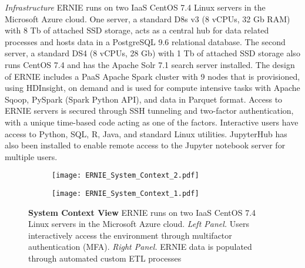 \documentclass[review]{elsarticle}
\begin{document}
\emph{Infrastructure} ERNIE runs on two IaaS CentOS 7.4 Linux servers in the Microsoft Azure cloud. One server, a standard D8s v3 (8 vCPUs, 32 Gb RAM) with 8 Tb of attached SSD storage, acts as a central hub for data related processes and hosts data in a PostgreSQL 9.6 relational database. The second server, a standard DS4 (8 vCPUs, 28 Gb) with 1 Tb of attached SSD storage also runs CentOS 7.4 and has the Apache Solr 7.1 search server installed. The design of ERNIE includes a PaaS Apache Spark cluster with 9 nodes  that is provisioned, using HDInsight, on demand and  is used for compute intensive tasks with Apache Sqoop, PySpark (Spark Python API), and data in Parquet format. Access to ERNIE servers is secured through SSH tunneling and two-factor authentication, with a unique time-based code acting as one of the factors. Interactive users have access to Python, SQL, R, Java, and standard Linux utilities. JupyterHub has also been installed to enable remote access to the Jupyter notebook server for multiple users. 

\begin{figure}[!h]
\centering
\scalebox{0.99}
{
\begin{subfigure}{.5\textwidth}
  \centering
\texttt{[image: ERNIE\_System\_Context\_2.pdf]}
  \label{fig:sub1}
\end{subfigure}
\begin{subfigure}{.5\textwidth}
  \centering
 \texttt{[image: ERNIE\_System\_Context\_1.pdf]}
  \label{fig:sub2}
\end{subfigure}
}
\caption{{\bf System Context View} ERNIE runs on two IaaS CentOS 7.4 Linux servers in the Microsoft Azure cloud. \emph{Left Panel.} Users interactively access the environment through multifactor authentication (MFA). \emph{Right Panel.} ERNIE data is populated through automated custom ETL processes }
\label{fig: test}
\end{figure}
\end{document}
